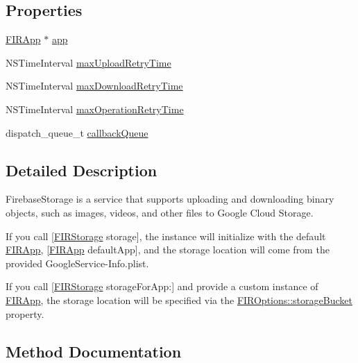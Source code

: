 \subsection*{Properties}
\begin{DoxyCompactItemize}
\item 
\hyperlink{interface_f_i_r_app}{F\+I\+R\+App} $\ast$ \hyperlink{interface_f_i_r_storage_acb8f251a84f7adf957795b1305350025}{app}
\item 
N\+S\+Time\+Interval \hyperlink{interface_f_i_r_storage_aa661aa6cfbf3810148d56a3897002549}{max\+Upload\+Retry\+Time}
\item 
N\+S\+Time\+Interval \hyperlink{interface_f_i_r_storage_aceb260f6e31d980386560e46c0903772}{max\+Download\+Retry\+Time}
\item 
N\+S\+Time\+Interval \hyperlink{interface_f_i_r_storage_a197aa620f2ba27a1c898e6c77b791f0f}{max\+Operation\+Retry\+Time}
\item 
dispatch\+\_\+queue\+\_\+t \hyperlink{interface_f_i_r_storage_a96538feb8fc023d6771f6ce2b614eee5}{callback\+Queue}
\end{DoxyCompactItemize}


\subsection{Detailed Description}
Firebase\+Storage is a service that supports uploading and downloading binary objects, such as images, videos, and other files to Google Cloud Storage.

If you call \mbox{[}\hyperlink{interface_f_i_r_storage}{F\+I\+R\+Storage} storage\mbox{]}, the instance will initialize with the default \hyperlink{interface_f_i_r_app}{F\+I\+R\+App}, \mbox{[}\hyperlink{interface_f_i_r_app}{F\+I\+R\+App} default\+App\mbox{]}, and the storage location will come from the provided Google\+Service-\/\+Info.\+plist.

If you call \mbox{[}\hyperlink{interface_f_i_r_storage}{F\+I\+R\+Storage} storage\+For\+App\+:\mbox{]} and provide a custom instance of \hyperlink{interface_f_i_r_app}{F\+I\+R\+App}, the storage location will be specified via the \hyperlink{interface_f_i_r_options_a53cff0d6c7dfec85412f2e0c345ad7fc}{F\+I\+R\+Options\+::storage\+Bucket} property. 

\subsection{Method Documentation}
\hypertarget{interface_f_i_r_storage_acf8749ecdcad4629aa32f25b6d1aa002}{}
